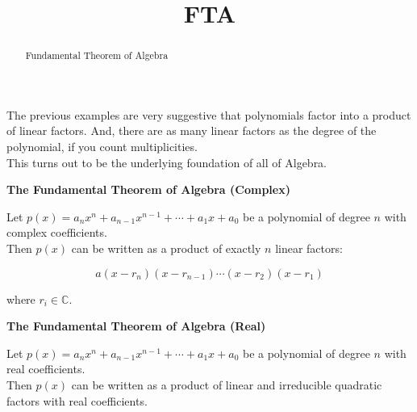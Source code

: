 \documentclass{ximera}
\title{FTA}
\begin{document}
\begin{abstract}
Fundamental Theorem of Algebra
\end{abstract}
\maketitle









The previous examples are very suggestive that polynomials factor into a product of linear factors.  And, there are as many linear factors as the degree of the polynomial, if you count multiplicities. \\



This turns out to be the underlying foundation of all of Algebra. \\




\begin{theorem} \textbf{\textcolor{green!50!black}{The Fundamental Theorem of Algebra (Complex)}} 



Let $p(x) = a_n x^n + a_{n-1} x^{n-1} + \cdots + a_1 x + a_0$ be a polynomial of degree $n$ with complex coefficients. \\


Then $p(x)$ can be written as a product of exactly $n$ linear factors:

\[
 a (x - r_n) (x - r_{n-1}) \cdots (x - r_2)  (x - r_1) 
\]


where $r_i \in \mathbb{C}$.


\end{theorem}








\begin{theorem} \textbf{\textcolor{green!50!black}{The Fundamental Theorem of Algebra (Real)}} 



Let $p(x) = a_n x^n + a_{n-1} x^{n-1} + \cdots + a_1 x + a_0$ be a polynomial of degree $n$ with real coefficients. \\


Then $p(x)$ can be written as a product of linear and irreducible quadratic factors with real coefficients.


\end{theorem}
\end{document}
